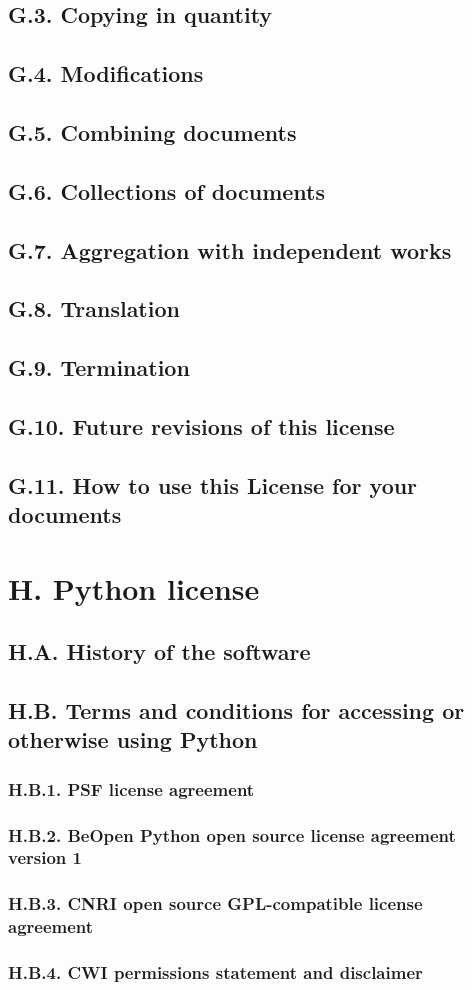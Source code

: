 \documentclass[oneside,12pt]{book}
\begin{document}
\section{G.3. Copying in quantity}
\section{G.4. Modifications}
\section{G.5. Combining documents}
\section{G.6. Collections of documents}
\section{G.7. Aggregation with independent works}
\section{G.8. Translation}
\section{G.9. Termination}
\section{G.10. Future revisions of this license}
\section{G.11. How to use this License for your documents}
   
\chapter{H. Python license}

\section{H.A. History of the software}
\section{H.B. Terms and conditions for accessing or otherwise using Python}
\subsection{H.B.1. PSF license agreement}
\subsection{H.B.2. BeOpen Python open source license agreement version 1}
\subsection{H.B.3. CNRI open source GPL-compatible license agreement}
\subsection{H.B.4. CWI permissions statement and disclaimer}
\end{document}
